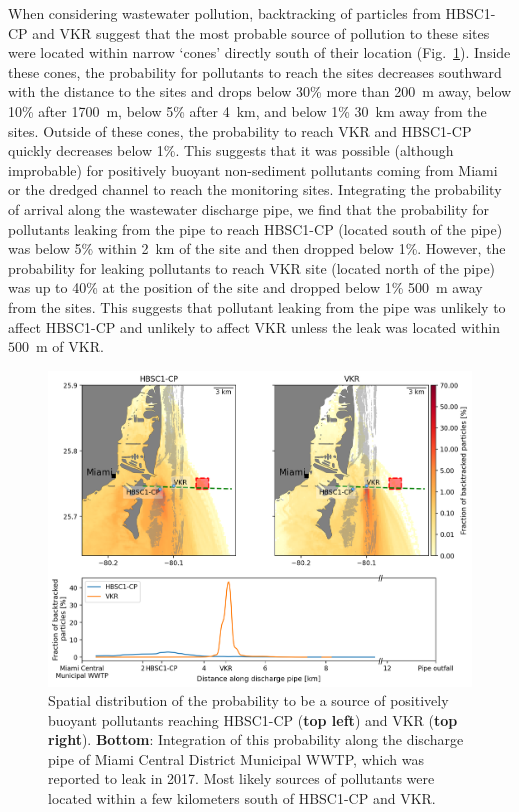 \documentclass[preprint,12pt,authoryear]{elsarticle}
\begin{document}
When considering wastewater pollution, backtracking of particles from HBSC1-CP and VKR suggest that the most probable source of pollution to these sites were located within narrow `cones' directly south of their location (Fig.~\ref{fig:backtrack}). Inside these cones, the probability for pollutants to reach the sites decreases southward with the distance to the sites and drops below 30\% more than 200~m away, below 10\% after 1700~m, below 5\% after 4~km, and below 1\%  30~km away from the sites. Outside of these cones, the probability to reach VKR and HBSC1-CP quickly decreases below 1\%. This suggests that it was possible (although improbable) for positively buoyant non-sediment pollutants coming from Miami or the dredged channel to reach the monitoring sites. Integrating the probability of arrival along the wastewater discharge pipe, we find that the probability for pollutants leaking from the pipe to reach HBSC1-CP (located south of the pipe) was below 5\% within 2~km of the site and then dropped below 1\%. However, the probability for leaking pollutants to reach VKR site (located north of the pipe) was up to 40\% at the position of the site and dropped below 1\% 500~m away from the sites. This suggests that pollutant leaking from the pipe was unlikely to affect HBSC1-CP and unlikely to affect VKR unless the leak was located within $500$~m of VKR.

\begin{figure}
    \centering
    \includegraphics[width=.98\textwidth]{figures/fig_proba_stokes_v2.png}
    \caption{Spatial distribution of the probability to be a source of positively buoyant pollutants reaching HBSC1-CP (\textbf{top left}) and VKR (\textbf{top right}). \textbf{Bottom}: Integration of this probability along the discharge pipe of Miami Central District Municipal WWTP, which was reported to leak in 2017. Most likely sources of pollutants were located within a few kilometers south of HBSC1-CP and VKR.}
    \label{fig:backtrack}
\end{figure}
\end{document}
